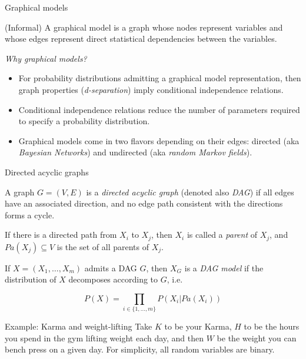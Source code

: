 \begin{frame}{Graphical models}
  \begin{definition}
    (Informal) A graphical model is a graph whose nodes represent variables and whose edges represent direct statistical dependencies between the variables.\newline
  \end{definition}

  \emph{Why graphical models?}
  \begin{itemize}
    \item For probability distributions admitting a graphical model representation, then graph properties (\emph{d-separation}) imply conditional independence relations.
    \item Conditional independence relations reduce the number of parameters required to specify a probability distribution.
    \item Graphical models come in two flavors depending on their edges: directed (aka \emph{Bayesian Networks}) and undirected (aka \emph{random Markov fields}).
  \end{itemize}
\end{frame}

\begin{frame}{Directed acyclic graphs}
  \begin{definition}
    A graph $G = (V, E)$ is a \emph{directed acyclic graph} (denoted also \emph{DAG}) if all edges have an associated direction, and no edge path consistent with the directions forms a cycle.\newline

    If there is a directed path from $X_i$ to $X_j$, then $X_i$ is called a \emph{parent} of $X_j$, and $Pa(X_j) \subseteq V$ is the set of all parents of $X_j$.
  \end{definition}

  \begin{definition}
    If $X = (X_1, \ldots, X_m)$ admits a DAG $G$, then $X_G$ is a \emph{DAG model} if the distribution of $X$ decomposes according to $G$, i.e.

    \begin{equation*}
      P(X) = \prod_{i \in \{1, \ldots, m\}} P(X_i | Pa(X_i))
    \end{equation*}
  \end{definition}
\end{frame}


\begin{frame}{Example: Karma and weight-lifting}
  Take $K$ to be your Karma, $H$ to be the hours you spend in the gym lifting weight each day, and then $W$ be the weight you can bench press on a given day. For simplicity, all random variables are binary.\newline

  \newline
\end{frame}



